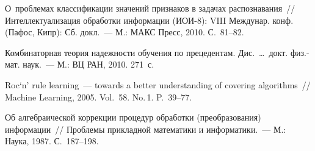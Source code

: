 \begin{multicols}{2}
{{\begin{thebibliography}{9}
О~проблемах классификации значений признаков в задачах распознавания~//
Интеллектуализация обработки информации (ИОИ-8): VIII Междунар.
конф. (Пафос, Кипр): Сб. докл.~--- М.: МАКС
Пресс, 2010. С.~81--82.

Комбинаторная теория надежности обучения по прецедентам. Дис.\ \ldots\
докт. физ.-мат. наук.~--- М.: ВЦ РАН, 2010. 271~с.

Roc`n' rule learning~--- towards a better understanding of covering algorithms~//
Machine Learning, 2005. Vol.~58. No.\,1. P.~39--77.

\label{end\stat}

Об алгебраической коррекции процедур обработки (преобразования)
информации~// Проблемы прикладной математики и информатики.~--- М.:
Наука, 1987. С.~187--198.
 \end{thebibliography}
}
}


\end{multicols}